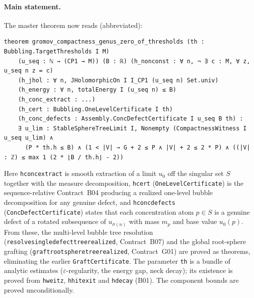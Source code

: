 \documentclass[11pt]{article}
\renewcommand{\_}{\origus\allowbreak}
\newcommand{\eps}{\varepsilon}
\newcommand{\code}[1]{\texttt{#1}}
\begin{document}
\paragraph{Main statement.} The master theorem now reads (abbreviated):
\begin{lstlisting}
theorem gromov_compactness_genus_zero_of_thresholds (th : Bubbling.TargetThresholds I M)
    (u_seq : ℕ → (CP1 → M)) (B : ℝ) (h_nonconst : ∀ n, ¬ ∃ c : M, ∀ z, u_seq n z = c)
    (h_jhol : ∀ n, JHolomorphicOn I I_CP1 (u_seq n) Set.univ)
    (h_energy : ∀ n, totalEnergy I (u_seq n) ≤ B)
    (h_conc_extract : ...)
    (h_cert : Bubbling.OneLevelCertificate I th)
    (h_conc_defects : Assembly.ConcDefectCertificate I u_seq B th) :
    ∃ u_lim : StableSphereTreeLimit I, Nonempty (CompactnessWitness I u_seq u_lim) ∧
      (P * th.h ≤ B) ∧ (1 < |V| → G + 2 ≤ P ∧ |V| + 2 ≤ 2 * P) ∧ ((|V| : ℤ) ≤ max 1 (2 * ⌊B / th.h⌋ - 2))
\end{lstlisting}
Here \code{h\_conc\_extract} is smooth extraction of a limit $u_0$ off the singular set $S$ together
with the measure decomposition, \code{h\_cert} (\code{OneLevelCertificate}) is the sequence-relative
Contract~B04 producing a realized one-level bubble decomposition for any genuine defect, and
\code{h\_conc\_defects} (\code{ConcDefectCertificate}) states that each concentration atom $p\in S$
is a genuine defect of a rotated subsequence of $u_{\sigma(n)}$ with mass $m_p$ and base value
$u_0(p)$. From these, the multi-level bubble tree resolution (\code{resolve\_single\_defect\_tree\_realized},
Contract~B07) and the global root-sphere grafting (\code{graft\_root\_sphere\_tree\_realized},
Contract~G01) are proved as theorems, eliminating the earlier \code{GraftCertificate}. The parameter
\code{th} is a bundle of analytic estimates ($\eps$-regularity, the energy gap, neck decay); its
existence is proved from \code{h\_weitz}, \code{h\_hit\_exit} and \code{h\_decay} (B01). The
component bounds are proved unconditionally.
\end{document}
